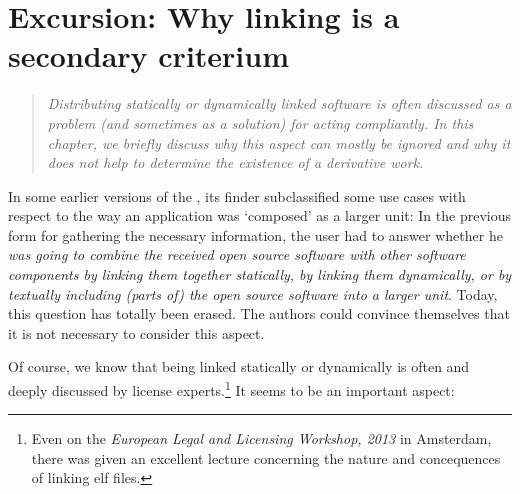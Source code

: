 %
%
%
%
%



\section{Excursion: Why linking is a secondary criterium}
\label{sec:LinkingSecondary}
\footnotesize
\begin{quote}\itshape
Distributing statically or dynamically linked software is often discussed as a
problem (and sometimes as a solution) for acting compliantly. In this chapter,
we briefly discuss why this aspect can mostly be ignored and why it does not
help to determine the existence of a derivative work.
\end{quote}
\normalsize

In some earlier versions of the \oslic{}, its finder subclassified some use cases
with respect to the way an application was `composed' as a larger unit: In the
previous form for gathering the necessary information, the \oslic{} user had to
answer whether he \emph{was going to combine the received open source software
with other software components by linking them together statically, by linking
them dynamically, or by textually including (parts of) the open source software
into a larger unit}. Today, this question has totally been erased. The
authors could convince themselves that it is not necessary to consider this
aspect.

Of course, we know that being linked statically or dynamically is often and
deeply discussed by license experts.\footnote{Even on the \emph{European Legal
and Licensing Workshop, 2013} in Amsterdam, there was given an excellent lecture
concerning the nature and concequences of linking elf files.} It seems to be an
important aspect:

